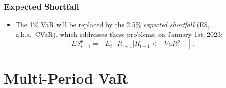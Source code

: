 \begin{frame}%

\frametitle{Expected Shortfall}

\begin{itemize}
\item The 1\% VaR will be replaced by the 2.5\%  \emph{%
\color{red}expected shortfall} (ES, a.k.a.\ CVaR), which addresses these problems, on January 1st, 2023:
\begin{equation*}
ES_{t+1}^{p}=-E_{t}\left[ R_{t+1}|R_{t+1}<-VaR_{t+1}^{p}\right] .
\end{equation*}

%
%
%
\end{itemize}

\end{frame}%
\section{Multi-Period VaR}\subsection*{}


